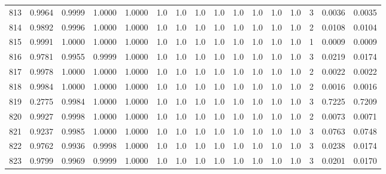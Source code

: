 \begin{tabular}{lrrrrrrrrrrrrrrr}
813 &      0.9964 &  0.9999 &  1.0000 &  1.0000 &     1.0 &     1.0 &     1.0 &     1.0 &     1.0 &     1.0 &      1.0 &        1.0 &      3 &                    0.0036 &                     0.0035 \\
814 &      0.9892 &  0.9996 &  1.0000 &  1.0000 &     1.0 &     1.0 &     1.0 &     1.0 &     1.0 &     1.0 &      1.0 &        1.0 &      2 &                    0.0108 &                     0.0104 \\
815 &      0.9991 &  1.0000 &  1.0000 &  1.0000 &     1.0 &     1.0 &     1.0 &     1.0 &     1.0 &     1.0 &      1.0 &        1.0 &      1 &                    0.0009 &                     0.0009 \\
816 &      0.9781 &  0.9955 &  0.9999 &  1.0000 &     1.0 &     1.0 &     1.0 &     1.0 &     1.0 &     1.0 &      1.0 &        1.0 &      3 &                    0.0219 &                     0.0174 \\
817 &      0.9978 &  1.0000 &  1.0000 &  1.0000 &     1.0 &     1.0 &     1.0 &     1.0 &     1.0 &     1.0 &      1.0 &        1.0 &      2 &                    0.0022 &                     0.0022 \\
818 &      0.9984 &  1.0000 &  1.0000 &  1.0000 &     1.0 &     1.0 &     1.0 &     1.0 &     1.0 &     1.0 &      1.0 &        1.0 &      2 &                    0.0016 &                     0.0016 \\
819 &      0.2775 &  0.9984 &  1.0000 &  1.0000 &     1.0 &     1.0 &     1.0 &     1.0 &     1.0 &     1.0 &      1.0 &        1.0 &      3 &                    0.7225 &                     0.7209 \\
820 &      0.9927 &  0.9998 &  1.0000 &  1.0000 &     1.0 &     1.0 &     1.0 &     1.0 &     1.0 &     1.0 &      1.0 &        1.0 &      2 &                    0.0073 &                     0.0071 \\
821 &      0.9237 &  0.9985 &  1.0000 &  1.0000 &     1.0 &     1.0 &     1.0 &     1.0 &     1.0 &     1.0 &      1.0 &        1.0 &      3 &                    0.0763 &                     0.0748 \\
822 &      0.9762 &  0.9936 &  0.9998 &  1.0000 &     1.0 &     1.0 &     1.0 &     1.0 &     1.0 &     1.0 &      1.0 &        1.0 &      3 &                    0.0238 &                     0.0174 \\
823 &      0.9799 &  0.9969 &  0.9999 &  1.0000 &     1.0 &     1.0 &     1.0 &     1.0 &     1.0 &     1.0 &      1.0 &        1.0 &      3 &                    0.0201 &                     0.0170 \\

\end{tabular}
